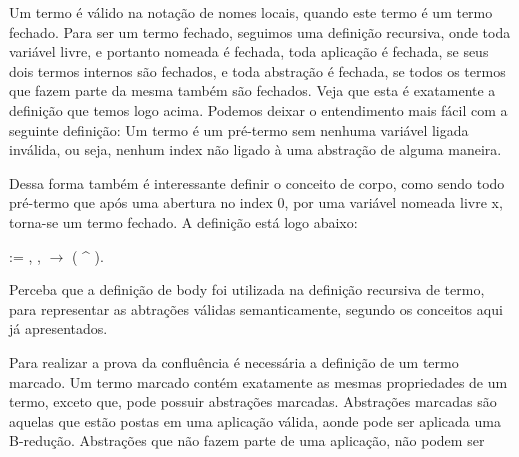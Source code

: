 Um termo é válido na notação de nomes locais, quando este termo é um termo fechado. 
Para ser um termo fechado, seguimos uma definição recursiva, onde toda variável livre, e portanto
nomeada é fechada, toda aplicação é fechada, se seus dois termos internos são fechados, e toda
abstração é fechada, se todos os termos que fazem parte da mesma também são fechados. Veja que esta é
exatamente a definição que temos logo acima. Podemos deixar o entendimento mais fácil com a seguinte
definição: Um termo é um pré-termo sem nenhuma variável ligada inválida, ou seja, nenhum index não ligado
à uma abstração de alguma maneira.

 Dessa forma também é interessante definir o conceito de corpo, como sendo todo pré-termo
que após uma abertura no index 0, por uma variável nomeada livre x, torna-se um termo fechado.
A definição está logo abaixo:\begin{coqdoccode}
\coqdocemptyline
\coqdocnoindent
{}   :=\coqdoceol
\coqdocindent{1.00em}
\coqdoctac{\ensuremath{\exists}} , \coqdockw{\ensuremath{\forall}} ,    \ensuremath{\rightarrow}  ( \^{} ).\coqdoceol
\coqdocemptyline
\end{coqdoccode}
Perceba que a definição de body foi utilizada na definição recursiva de termo, para
representar as abtrações válidas semanticamente, segundo os conceitos aqui já apresentados.\begin{coqdoccode}
\coqdocemptyline
\coqdocemptyline
\end{coqdoccode}
Para realizar a prova da confluência é necessária a definição de um termo marcado. Um
termo marcado contém exatamente as mesmas propriedades de um termo, exceto que, pode possuir
abstrações marcadas. Abstrações marcadas são aquelas que estão postas em uma aplicação válida,
aonde pode ser aplicada uma B-redução. Abstrações que não fazem parte de uma aplicação, não podem ser 
